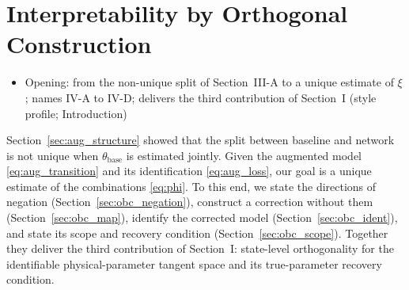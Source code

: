 \section{Interpretability by Orthogonal Construction}\label{sec:obc}
\ifdraft
\begin{itemize}
\item Opening: from the non-unique split of Section~III-A to a unique estimate of $\xi$; names IV-A to IV-D; delivers the third contribution of Section~I (style profile; Introduction)
\end{itemize}
\fi

Section~\ref{sec:aug_structure} showed that the split between baseline and
network is not unique when $\theta_{\mathrm{base}}$ is estimated jointly.
Given the augmented model \eqref{eq:aug_transition} and its identification
\eqref{eq:aug_loss}, our goal is a unique estimate of the combinations
\eqref{eq:phi}.
To this end, we state the directions of negation
(Section~\ref{sec:obc_negation}), construct a correction without them
(Section~\ref{sec:obc_map}), identify the corrected model
(Section~\ref{sec:obc_ident}), and state its scope and recovery condition
(Section~\ref{sec:obc_scope}).
Together they deliver the third contribution of Section~I: state-level
orthogonality for the identifiable physical-parameter tangent space and its
true-parameter recovery condition.

